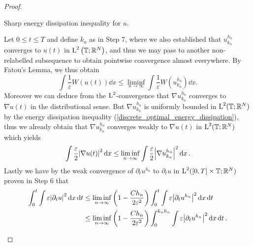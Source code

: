 \begin{proof}
\begin{description}[wide=0pt]
		\item[Step 8:] Sharp energy dissipation inequality for $ u $.
		
		Let $ 0 \leq t \leq T $ and define $ k_{ n } $ as in Step 7, where we 
		also established that $ u_{ k_{ n } }^{ h_{ n } } $ converges to $ u ( 
		t ) $ in $ \operatorname{L}^{ 2 } \left( \operatorname{\mathbb{T}} ; \mathbb{ R }^{ N } \right) $, 
		and thus we may pass to another non-relabelled subsequence to obtain 
		pointwise convergence almost everywhere. By Fatou's Lemma, we thus 
		obtain
		\begin{equation*}
			\int
			\frac{ 1 }{ \varepsilon }
			W ( u ( t ) ) 
			\dd{ x }
			\leq
			\liminf_{ n \to \infty }
			\int
			\frac{ 1 }{ \varepsilon }
			W ( u_{ k_{ n } }^{ h_{ n } } )
			\dd{ x }.
		\end{equation*}
		Moreover we can deduce from the $ \operatorname{L}^{ 2 } $-convergence that $ \nabla 
		u_{ k_{ n } }^{ h_{ n } } $ converges to $ \nabla u( t ) $ in the 
		distributional sense. But $ \nabla u_{ k_{ n } }^{ h_{ n } } $ is 
		uniformly bounded in $ \operatorname{L}^{ 2 } ( \operatorname{\mathbb{T}} ; \mathbb{ R }^{ N } ) $ 
		by the energy dissipation inequality 
		(\ref{discrete_optimal_energy_dissipation}), thus we already obtain 
		that $ \nabla u_{ k_{ n } }^{ h_{ n } } $ converges weakly to $ \nabla 
		u ( t ) $ in $ \operatorname{L}^{ 2 } ( \operatorname{\mathbb{T}}; \mathbb{ R }^{ N } ) $ which 
		yields
		\begin{equation*}
			\int 
			\frac{ \varepsilon }{ 2 }
			\abs{ \nabla u ( t ) }^{ 2 }
			\dd{ x }
			\leq
			\liminf_{ n \to \infty }
			\int
			\frac{ \varepsilon }{ 2 }
			\abs{ \nabla u_{ k_{ n } }^{ h_{ n } } }^{ 2 }
			\dd{ x }.
		\end{equation*}
		Lastly we have by the weak convergence of $ \partial_{ t } u^{ h_{n } } 
		$ to $ \partial_{ t} u $ in $\operatorname{L}^{ 2 } ( [ 0, T ] \times  \operatorname{\mathbb{T}} ; 
		\mathbb{ R }^{ N } ) $ proven in Step 6 that
		\begin{align*}
			\int_{ 0 }^{ t }
			\int
			\varepsilon
			\abs{ \partial_{ t } u }^{ 2 }
			\dd{ x }
			\dd{ t }
			& \leq
			\liminf_{ n \to \infty }
			\left( 1 - \frac{ C h_{ n } }{ 2 \varepsilon^{ 2 } } \right)
			\int_{ 0 }^{ t }
			\int
			\varepsilon
			\abs{ \partial_{ t } u^{ h_{ n } } }^{ 2 }
			\dd{ x }
			\dd{ t }
			\\
			& \leq
			\liminf_{ n \to \infty }
			\left( 1 - \frac{ C h_{ n } }{ 2 \varepsilon^{ 2 } } \right)
			\int_{ 0 }^{ k_{ n } h_{ n } }
			\int
			\varepsilon
			\abs{ \partial_{ t } u^{ h_{ n } } }^{ 2 }
			\dd{ x }
			\dd{ t }.		
		\end{align*}

\end{description}
\end{proof}
